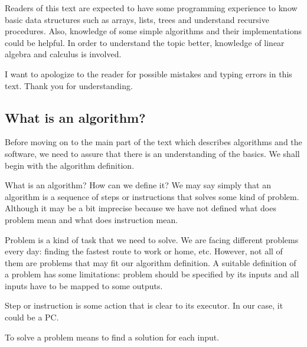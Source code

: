 \documentclass[
  field=inf,
  biblatex,
  language=english,
  glossaries,
  index
]{kidiplom}
\begin{document}
Readers of this text are expected to have some programming experience to know basic data structures such as arrays, lists, trees and understand recursive procedures. Also, knowledge of some simple algorithms and their implementations could be helpful. In order to understand the topic better, knowledge of linear algebra and calculus is involved.

I want to apologize to the reader for possible mistakes and typing errors in this text. Thank you for understanding.

\newpage
\subsection{What is an algorithm?}

Before moving on to the main part of the text which describes algorithms and the software, we need to assure that there is an understanding of the basics. We shall begin with the algorithm definition.

What is an algorithm? How can we define it? We may say simply that an algorithm is a sequence of steps or instructions that solves some kind of problem. Although it may be a bit imprecise because we have not defined what does problem mean and what does instruction mean.

Problem is a kind of task that we need to solve. We are facing different problems every day: finding the fastest route to work or home, etc. However, not all of them are problems that may fit our algorithm definition. A suitable definition of a problem has some limitations: problem should be specified by its inputs and all inputs have to be mapped to some outputs.

Step or instruction is some action that is clear to its executor. In our case, it could be a PC.

To solve a problem means to find a solution for each input.
\end{document}
